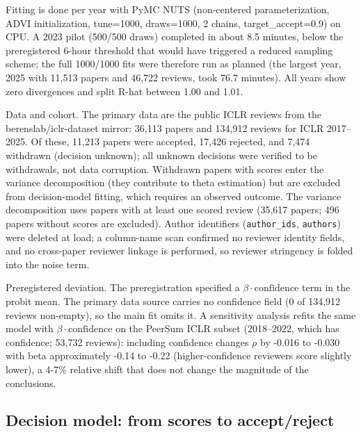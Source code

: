 \documentclass[10pt]{article}
\begin{document}
Fitting is done per year with PyMC NUTS (non-centered parameterization, ADVI initialization, tune=1000, draws=1000, 2 chains, target\_accept=0.9) on CPU. A 2023 pilot (500/500 draws) completed in about 8.5 minutes, below the preregistered 6-hour threshold that would have triggered a reduced sampling scheme; the full 1000/1000 fits were therefore run as planned (the largest year, 2025 with 11,513 papers and 46,722 reviews, took 76.7 minutes). All years show zero divergences and split R-hat between 1.00 and 1.01.

Data and cohort. The primary data are the public ICLR reviews from the berenslab/iclr-dataset mirror: 36,113 papers and 134,912 reviews for ICLR 2017--2025. Of these, 11,213 papers were accepted, 17,426 rejected, and 7,474 withdrawn (decision unknown); all unknown decisions were verified to be withdrawals, not data corruption. Withdrawn papers with scores enter the variance decomposition (they contribute to theta estimation) but are excluded from decision-model fitting, which requires an observed outcome. The variance decomposition uses papers with at least one scored review (35,617 papers; 496 papers without scores are excluded). Author identifiers (\texttt{author\_ids}, \texttt{authors}) were deleted at load; a column-name scan confirmed no reviewer identity fields, and no cross-paper reviewer linkage is performed, so reviewer stringency is folded into the noise term.

Preregistered deviation. The preregistration specified a $\beta\cdot\mathrm{confidence}$ term in the probit mean. The primary data source carries no confidence field (0 of 134,912 reviews non-empty), so the main fit omits it. A sensitivity analysis refits the same model with $\beta\cdot\mathrm{confidence}$ on the PeerSum ICLR subset (2018--2022, which has confidence; 53,732 reviews): including confidence changes $\rho$ by -0.016 to -0.030 with beta approximately -0.14 to -0.22 (higher-confidence reviewers score slightly lower), a 4-7\% relative shift that does not change the magnitude of the conclusions.

\subsection{Decision model: from scores to accept/reject}
\end{document}
